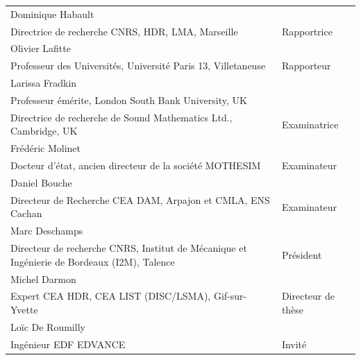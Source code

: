 \documentclass[a4paper]{article}
\newcommand{\jurynameA}{Dominique Habault}
\newcommand{\juryadressA}{Directrice de recherche CNRS, HDR, LMA, Marseille}
\newcommand{\juryroleA}{Rapportrice}
\newcommand{\jurynameB}{Olivier Lafitte}
\newcommand{\juryadressB}{Professeur des Universités, Université Paris 13, Villetaneuse}
\newcommand{\juryroleB}{Rapporteur}
\newcommand{\jurynameC}{Frédéric Molinet}
\newcommand{\juryadressC}{Docteur d'état, ancien directeur de la société MOTHESIM}
\newcommand{\juryroleC}{Examinateur}
\newcommand{\jurynameD}{Daniel Bouche}
\newcommand{\juryadressD}{Directeur de Recherche CEA DAM, Arpajon et CMLA, ENS Cachan}
\newcommand{\juryroleD}{Examinateur}
\newcommand{\jurynameE}{Larissa Fradkin}
\newcommand{\juryadressE}{Professeur émérite, London South Bank University, UK\\ Directrice de recherche de Sound Mathematics Ltd., Cambridge, UK}
\newcommand{\juryroleE}{Examinatrice}
\newcommand{\jurynameF}{Michel Darmon}
\newcommand{\juryadressF}{Expert CEA HDR, CEA LIST (DISC/LSMA), Gif-sur-Yvette}
\newcommand{\juryroleF}{Directeur de thèse}
\newcommand{\jurynameG}{Gilles Lebeau}
\newcommand{\juryadressG}{Professeur, Université de Nice Sophia-Antipolis (Laboratoire J. A. Dieudonné), Nice}
\newcommand{\juryroleG}{Co-directeur de thèse}
\newcommand{\jurynameH}{Loïc De Roumilly}
\newcommand{\juryadressH}{Ingénieur EDF EDVANCE}
\newcommand{\juryroleH}{Invité}
\newcommand{\jurynameI}{Marc Deschamps}
\newcommand{\juryadressI}{Directeur de recherche CNRS, Institut de Mécanique et Ingénierie de Bordeaux (I2M), Talence}
\newcommand{\juryroleI}{Président}
\begin{document}
\begin{textblock}{10.3}
	\label{jury} 																				%
	\begin{flushleft}
	\begin{tabular}{@{} L{9.5cm} R{4.5cm}}
		\jurynameA  \\ \juryadressA & \juryroleA \\[10pt]
		\jurynameB  \\ \juryadressB & \juryroleB \\[10pt]
		\jurynameE  \\ \juryadressE & \juryroleE \\[10pt]
		\jurynameC  \\ \juryadressC & \juryroleC \\[10pt]
		\jurynameD  \\ \juryadressD & \juryroleD \\[10pt]
		\jurynameI  \\ \juryadressI & \juryroleI \\[10pt]
		\jurynameF  \\ \juryadressF & \juryroleF \\[10pt]
		\jurynameH  \\ \juryadressH & \juryroleH \\[5pt]
	\end{tabular} 
	\end{flushleft}   
\end{textblock}
\end{document}
